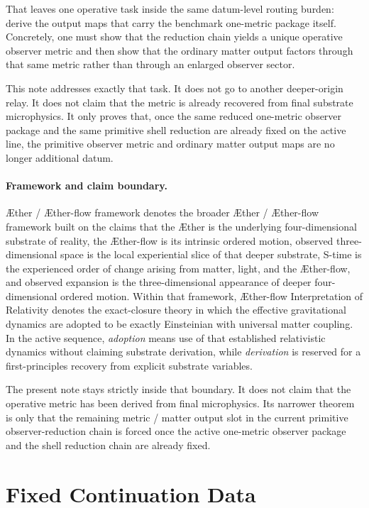 \documentclass[11pt]{article}
\newcommand{\Aether}{\AE{}ther}
\newcommand{\Aflow}{\AE{}ther-flow}
\newcommand{\TheoryName}{\Aflow{} Interpretation of Relativity}
\newcommand{\TheoryProgram}{\Aether{} / \Aflow{} framework}
\begin{document}
That leaves one operative task inside the same datum-level routing burden: derive the output maps that carry the benchmark one-metric package itself. Concretely, one must show that the reduction chain yields a unique operative observer metric and then show that the ordinary matter output factors through that same metric rather than through an enlarged observer sector.

This note addresses exactly that task. It does not go to another deeper-origin relay. It does not claim that the metric is already recovered from final substrate microphysics. It only proves that, once the same reduced one-metric observer package and the same primitive shell reduction are already fixed on the active line, the primitive observer metric and ordinary matter output maps are no longer additional datum.

\paragraph{Framework and claim boundary.}
\TheoryProgram{} denotes the broader \Aether{} / \Aflow{} framework built on the claims that the \Aether{} is the underlying four-dimensional substrate of reality, the \Aflow{} is its intrinsic ordered motion, observed three-dimensional space is the local experiential slice of that deeper substrate, S-time is the experienced order of change arising from matter, light, and the \Aflow{}, and observed expansion is the three-dimensional appearance of deeper four-dimensional ordered motion. Within that framework, \TheoryName{} denotes the exact-closure theory in which the effective gravitational dynamics are adopted to be exactly Einsteinian with universal matter coupling. In the active sequence, \emph{adoption} means use of that established relativistic dynamics without claiming substrate derivation, while \emph{derivation} is reserved for a first-principles recovery from explicit substrate variables.

The present note stays strictly inside that boundary. It does not claim that the operative metric has been derived from final microphysics. Its narrower theorem is only that the remaining metric / matter output slot in the current primitive observer-reduction chain is forced once the active one-metric observer package and the shell reduction chain are already fixed.

\section{Fixed Continuation Data}
\end{document}
